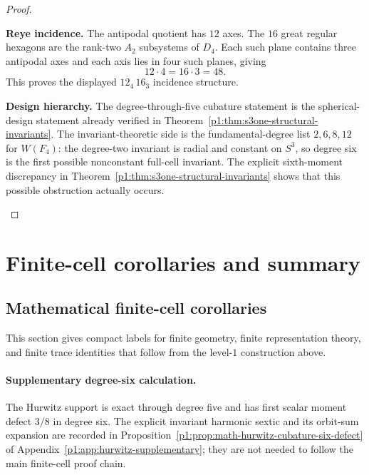 \documentclass[11pt]{article}
\begin{document}
\begin{proof}
\begin{proofsteps}[label=\textbf{(\roman*)}]
\item \textbf{Reye incidence.}
The antipodal quotient has \(12\) axes.  The \(16\) great regular hexagons are the rank-two \(A_2\) subsystems of \(D_4\).  Each such plane contains three antipodal axes and each axis lies in four such planes, giving
\[
12\cdot4=16\cdot3=48.
\]
This proves the displayed \(12_4\,16_3\) incidence structure.

\item \textbf{Design hierarchy.}
The degree-through-five cubature statement is the spherical-design statement already verified in Theorem~\ref{p1:thm:s3one-structural-invariants}.  The invariant-theoretic side is the fundamental-degree list \(2,6,8,12\) for \(W(F_4)\): the degree-two invariant is radial and constant on \(S^3\), so degree six is the first possible nonconstant full-cell invariant.  The explicit sixth-moment discrepancy in Theorem~\ref{p1:thm:s3one-structural-invariants} shows that this possible obstruction actually occurs.
\end{proofsteps}
\end{proof}


\section{Finite-cell corollaries and summary}
\label{p1:sec:finite-cell-corollaries-summary}

\subsection{Mathematical finite-cell corollaries}
\label{p1:sec:math-finite-cell-corollaries}

This section gives compact labels for finite geometry, finite representation theory, and finite trace identities that follow from the level-\(1\) construction above.

\paragraph{Supplementary degree-six calculation.}
The Hurwitz support is exact through degree five and has first scalar moment
defect \(3/8\) in degree six.  The explicit invariant harmonic sextic and its
orbit-sum expansion are recorded in
Proposition~\ref{p1:prop:math-hurwitz-cubature-six-defect} of
Appendix~\ref{p1:app:hurwitz-supplementary}; they are not needed to follow the
main finite-cell proof chain.
\end{document}
